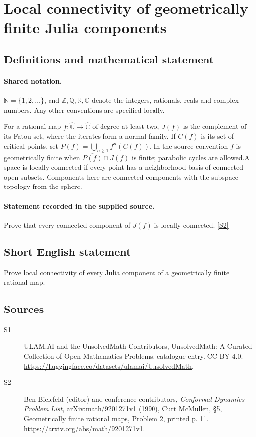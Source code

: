 \documentclass[11pt]{article}
\newcommand{\sref}[2]{\hyperlink{source:#1:#2}{[S#2]}}
\begin{document}
\section{Local connectivity of geometrically finite Julia components}\label{statement}

\subsection{Definitions and mathematical statement}

\paragraph{Shared notation.}$\mathbb N=\{1,2,\ldots\}$, and $\mathbb Z,\mathbb Q,\mathbb R,\mathbb C$ denote the integers, rationals, reals and complex numbers. Any other conventions are specified locally.


For a rational map $f:\widehat{\mathbb C}\to\widehat{\mathbb C}$ of degree at least two, $J(f)$ is the complement of its Fatou set, where the iterates form a normal family. If $C(f)$ is its set of critical points, set $P(f)=\bigcup_{n\geq1}f^n(C(f))$. In the source convention $f$ is geometrically finite when $\overline{P(f)}\cap J(f)$ is finite; parabolic cycles are allowed.A space is locally connected if every point has a neighborhood basis of connected open subsets. Components here are connected components with the subspace topology from the sphere.
\paragraph{Statement recorded in the supplied source.}
Prove that every connected component of $J(f)$ is locally connected. \sref{statement}{2}
\subsection{Short English statement}
Prove local connectivity of every Julia component of a geometrically finite rational map.
\subsection{Sources}
\begin{description}
\item[\hypertarget{source:statement:1}{S1}] ULAM.AI and the UnsolvedMath Contributors, UnsolvedMath: A Curated Collection of Open Mathematics Problems, catalogue entry. CC BY 4.0. \url{https://huggingface.co/datasets/ulamai/UnsolvedMath}.
\item[\hypertarget{source:statement:2}{S2}] Ben Bielefeld (editor) and conference contributors, \emph{Conformal Dynamics Problem List}, arXiv:math/9201271v1 (1990), Curt McMullen, \S5, Geometrically finite rational maps, Problem 2, printed p. 11. \url{https://arxiv.org/abs/math/9201271v1}.
\end{description}
\label{end:statement}
\end{document}
